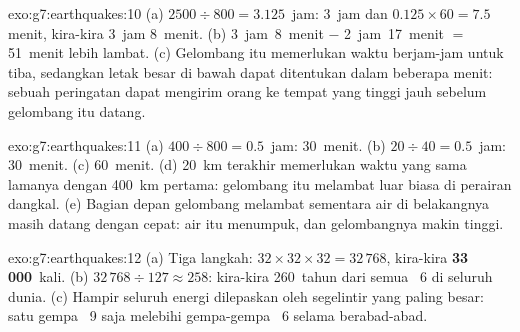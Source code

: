 \begin{solution}{exo:g7:earthquakes:10}
(a) $2500 \div 800 = 3.125$~jam: 3~jam dan $0.125 \times 60 = 7.5$
menit, kira-kira 3~jam 8~menit. (b) 3~jam~8~menit $-$ 2~jam~17~menit $=$
51~menit lebih lambat. (c) Gelombang itu memerlukan waktu berjam-jam untuk
tiba, sedangkan letak  besar di bawah  dapat ditentukan
dalam beberapa menit: sebuah peringatan dapat mengirim orang ke tempat yang
tinggi jauh sebelum gelombang itu datang.
\end{solution}

\begin{solution}{exo:g7:earthquakes:11}
(a) $400 \div 800 = 0.5$~jam: 30~menit. (b) $20 \div 40 = 0.5$~jam:
30~menit. (c) 60~menit. (d) \qty{20}{km} terakhir memerlukan waktu yang
sama lamanya dengan \qty{400}{km} pertama: gelombang itu melambat luar
biasa di perairan dangkal. (e) Bagian depan gelombang melambat sementara
air di belakangnya masih datang dengan cepat: air itu menumpuk, dan
gelombangnya makin tinggi.
\end{solution}

\begin{solution}{exo:g7:earthquakes:12}
(a) Tiga langkah: $32 \times 32 \times 32 = 32\,768$, kira-kira
\textbf{33\,000}~kali. (b) $32\,768 \div 127 \approx 258$: kira-kira
260~tahun dari semua  ~6 di seluruh dunia. (c) Hampir
seluruh energi dilepaskan oleh segelintir  yang paling besar:
satu gempa ~9 saja melebihi gempa-gempa ~6 selama
berabad-abad.
\end{solution}

